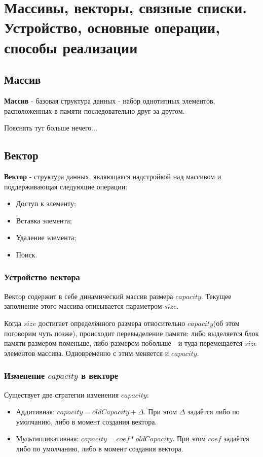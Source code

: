 \section{Массивы, векторы, связные списки. Устройство, основные операции, способы реализации}

\subsection{Массив}
\begin{definition}
    \textbf{Массив} - базовая структура данных - набор однотипных элементов, расположенных в памяти последовательно друг за другом.
\end{definition}
Пояснять тут больше нечего...

\subsection{Вектор}

\begin{definition}
    \textbf{Вектор} - структура данных, являющаяся надстройкой над массивом и поддерживающая следующие операции:
    \begin{itemize}
        \item Доступ к элементу; 
        \item Вставка элемента;
        \item Удаление элемента;
        \item Поиск.
    \end{itemize}
\end{definition}
\subsubsection{Устройство вектора}
Вектор содержит в себе динамический массив размера $capacity$. Текущее заполнение этого массива описывается параметром $size$.

Когда $size$ достигает определённого размера относительно $capacity$(об этом поговорим чуть позже), происходит перевыделение памяти: либо выделяется блок памяти размером поменьше, либо размером побольше - и туда перемещается $size$ элементов массива. Одновременно с этим меняется и $capacity$.

\subsubsection{Изменение $capacity$ в векторе}
Существует две стратегии изменения $capacity$:
\begin{itemize}
    \item Аддитивная: $capacity = oldCapacity + \Delta$. При этом $\Delta$ задаётся либо по умолчанию, либо в момент создания вектора.
    \item Мультипликативная: $capacity = coef * oldCapacity$. При этом $coef$ задаётся либо по умолчанию, либо в момент создания вектора.
\end{itemize}


